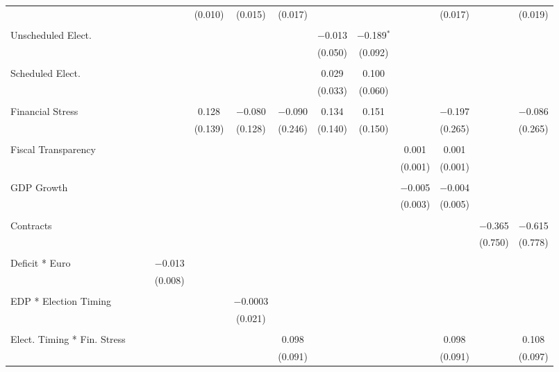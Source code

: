 \begin{table}[!htbp]
\begin{tabular}{@{\extracolsep{5pt}}lcccccccccccc}
  &  &  &  & (0.010) & (0.015) & (0.017) &  &  &  & (0.017) &  & (0.019) \\ 
  & & & & & & & & & & & & \\ 
 Unscheduled Elect. &  &  &  &  &  &  & $-$0.013 & $-$0.189$^{*}$ &  &  &  &  \\ 
  &  &  &  &  &  &  & (0.050) & (0.092) &  &  &  &  \\ 
  & & & & & & & & & & & & \\ 
 Scheduled Elect. &  &  &  &  &  &  & 0.029 & 0.100 &  &  &  &  \\ 
  &  &  &  &  &  &  & (0.033) & (0.060) &  &  &  &  \\ 
  & & & & & & & & & & & & \\ 
 Financial Stress &  &  &  & 0.128 & $-$0.080 & $-$0.090 & 0.134 & 0.151 &  & $-$0.197 &  & $-$0.086 \\ 
  &  &  &  & (0.139) & (0.128) & (0.246) & (0.140) & (0.150) &  & (0.265) &  & (0.265) \\ 
  & & & & & & & & & & & & \\ 
 Fiscal Transparency &  &  &  &  &  &  &  &  & 0.001 & 0.001 &  &  \\ 
  &  &  &  &  &  &  &  &  & (0.001) & (0.001) &  &  \\ 
  & & & & & & & & & & & & \\ 
 GDP Growth &  &  &  &  &  &  &  &  & $-$0.005 & $-$0.004 &  &  \\ 
  &  &  &  &  &  &  &  &  & (0.003) & (0.005) &  &  \\ 
  & & & & & & & & & & & & \\ 
 Contracts &  &  &  &  &  &  &  &  &  &  & $-$0.365 & $-$0.615 \\ 
  &  &  &  &  &  &  &  &  &  &  & (0.750) & (0.778) \\ 
  & & & & & & & & & & & & \\ 
 Deficit * Euro &  &  & $-$0.013 &  &  &  &  &  &  &  &  &  \\ 
  &  &  & (0.008) &  &  &  &  &  &  &  &  &  \\ 
  & & & & & & & & & & & & \\ 
 EDP * Election Timing &  &  &  &  & $-$0.0003 &  &  &  &  &  &  &  \\ 
  &  &  &  &  & (0.021) &  &  &  &  &  &  &  \\ 
  & & & & & & & & & & & & \\ 
 Elect. Timing * Fin. Stress &  &  &  &  &  & 0.098 &  &  &  & 0.098 &  & 0.108 \\ 
  &  &  &  &  &  & (0.091) &  &  &  & (0.091) &  & (0.097) \\ 

\end{tabular}
\end{table}
